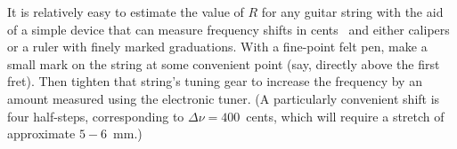 It is relatively easy to estimate the value of $R$ for any guitar string with the aid of a simple device that can measure frequency shifts in cents~\cite{ref:pgtweb} and either calipers or a ruler with finely marked graduations. With a fine-point felt pen, make a small mark on the string at some convenient point (say, directly above the first fret). Then tighten that string's tuning gear to increase the frequency by an amount measured using the electronic tuner. (A particularly convenient shift is four half-steps, corresponding to $\Delta \nu = 400$~cents, which will require a stretch of approximate $5 - 6$~mm.)

%
%
%
